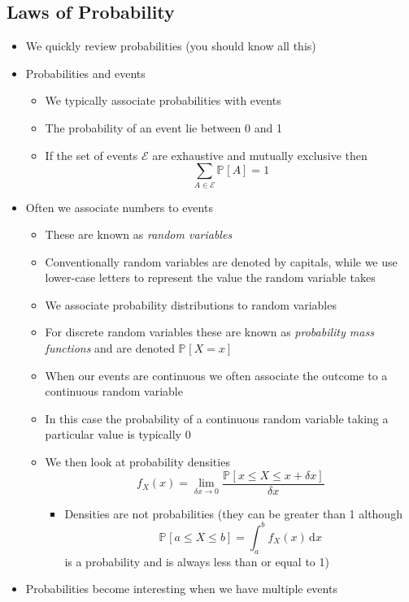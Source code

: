 \documentclass[11pt]{article}
\newcommand{\Prob}[2][]{\mathbb{P}_{#1\!}\left[ #2 \right]}
\newcommand{\dd}{\mathrm{d}}
\begin{document}
\subsection{Laws of Probability}
\label{sec:org15b8190}
\begin{itemize}
\item We  quickly review probabilities (you should know all this)
\item Probabilities and events
\begin{itemize}
\item We typically associate probabilities with events
\item The probability of an event lie between 0 and 1
\item If the set of events \(\mathcal{E}\) are exhaustive and
mutually exclusive then
$$ \sum_{A\in\mathcal{E}} \Prob{A} = 1 $$
\end{itemize}
\item Often we associate numbers to events
\begin{itemize}
\item These are known as \emph{random variables}
\item Conventionally random variables are denoted by capitals,
while we use lower-case letters to represent the value the
random variable takes
\item We associate probability distributions to random variables
\item For discrete random variables these are known as
\emph{probability mass functions} and are denoted \(\Prob{X=x}\)
\item When our events are continuous we often associate the outcome
to a continuous random variable
\item In this case the probability of a continuous random variable
taking a particular value is typically 0
\item We then look at probability densities
$$ f_X(x) = \lim_{\delta x \rightarrow 0} \frac{\Prob{x\leq X \leq
        x+\delta x}}{\delta x} $$
\begin{itemize}
\item Densities are not probabilities (they can be greater than 1
although
$$ \Prob{a\leq X \leq b} = \int_a^b f_X(x)\,\dd x $$
is a probability and is always less than or equal to 1)
\end{itemize}
\end{itemize}
\item Probabilities become interesting when we have multiple events
\begin{itemize}

\end{itemize}
\end{itemize}
\end{document}
